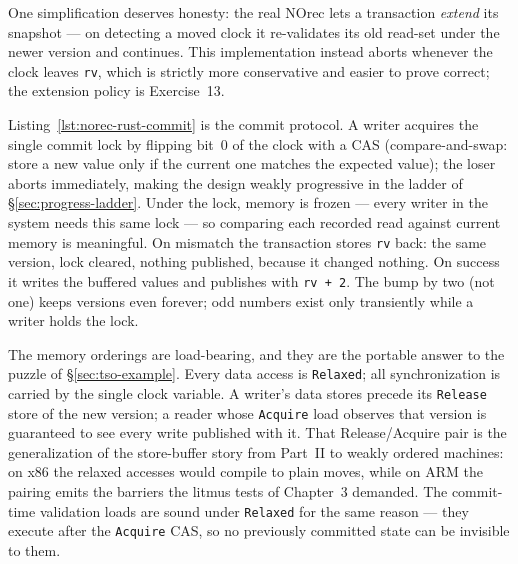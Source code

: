 

One simplification deserves honesty: the real NOrec lets a transaction
\emph{extend} its snapshot --- on detecting a moved clock it re-validates
its old read-set under the newer version and continues. This
implementation instead aborts whenever the clock leaves \texttt{rv},
which is strictly more conservative and easier to prove correct; the
extension policy is Exercise~13.

Listing~\ref{lst:norec-rust-commit} is the commit protocol. A writer
acquires the single commit lock by flipping bit~0 of the clock with a
CAS (compare-and-swap: store a new value only if the current one matches
the expected value); the loser aborts immediately, making the design weakly progressive
in the ladder of \S\ref{sec:progress-ladder}. Under the lock, memory is
frozen --- every writer in the system needs this same lock --- so comparing
each recorded read against current memory is meaningful. On mismatch the
transaction stores \texttt{rv} back: the same version, lock cleared,
nothing published, because it changed nothing. On success it writes the
buffered values and publishes with \texttt{rv + 2}. The bump by two (not
one) keeps versions even forever; odd numbers exist only transiently
while a writer holds the lock.



The memory orderings are load-bearing, and they are the portable answer to
the puzzle of \S\ref{sec:tso-example}. Every data access is
\texttt{Relaxed}; all synchronization is carried by the single clock
variable. A writer's data stores precede its \texttt{Release} store of the
new version; a reader whose \texttt{Acquire} load observes that version is
guaranteed to see every write published with it. That Release/Acquire pair
is the generalization of the store-buffer story from Part~II to weakly
ordered machines: on x86 the relaxed accesses would compile to plain
moves, while on ARM the pairing emits the barriers the litmus tests of
Chapter~3 demanded. The commit-time validation loads are sound under
\texttt{Relaxed} for the same reason --- they execute after the
\texttt{Acquire} CAS, so no previously committed state can be invisible
to them.

